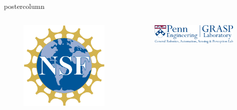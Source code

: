 \documentclass[final,hyperref={pdfpagelabels=false},5pt]{beamer}
\begin{document}
\begin{frame}
\begin{columns}
\begin{column}{.49\textwidth}
\begin{beamercolorbox}[center,wd=\textwidth]{postercolumn}
\begin{minipage}[T]{.95\textwidth}
{\begin{columns}[c]
\begin{column}{.25\textwidth}
				\begin{figure}
				
					\includegraphics[width=\textwidth]{NSFLogo}
				\end{figure}
				\end{column}
				\begin{column}{.64\textwidth}
				\centering
				\begin{figure}
				\centering
					\includegraphics[width=\textwidth]{grasp_logo1_blue}
				\end{figure}

				\end{column}
				\end{columns}
				

    
          }
        \end{minipage}
        
      \end{beamercolorbox}
      
    \end{column}


\end{columns}
\end{frame}
\end{document}
